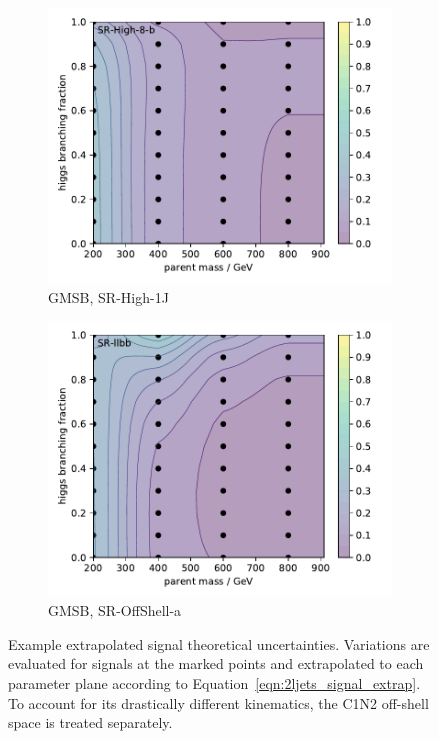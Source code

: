 \begin{figure}[tp]
\begin{subfigure}{0.48\textwidth}
\centering
\includegraphics[width=\textwidth]{figures/2ljets_signal_sys_gmsb_SRHigh8_2.pdf}
\caption{GMSB, SR-High-1J}
\end{subfigure}
\hfill
\begin{subfigure}{0.48\textwidth}
\centering
\includegraphics[width=\textwidth]{figures/2ljets_signal_sys_gmsb_SRllbb.pdf}
\caption{GMSB, SR-OffShell-a}
\end{subfigure}
\caption[
Example extrapolated signal theoretical uncertainties
]{%
Example extrapolated signal theoretical uncertainties.
Variations are evaluated for signals at the marked points and extrapolated to
each parameter plane according to Equation~\ref{eqn:2ljets_signal_extrap}.
To account for its drastically different kinematics, the C1N2 off-shell space
is treated separately.
}
\label{fig:2ljets_signal_sys_extrap}
\end{figure}

